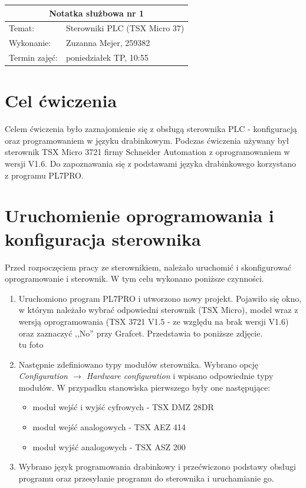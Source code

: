 \documentclass[12pt]{article}
\begin{document}
\begin{table}[H]
    \centering
    \renewcommand{\arraystretch}{1.5}
    \begin{tabularx}{\textwidth}{|X|X|}
    \hline
    \multicolumn{2}{|c|}{\large\textbf{Notatka służbowa nr 1}} \\ \hline
    Temat:          & Sterowniki PLC (TSX Micro 37)     \\ \hline
    Wykonanie:      & Zuzanna Mejer, 259382   \\ \hline
    Termin zajęć:   & poniedziałek TP, 10:55  \\ \hline  
    \end{tabularx}
    \end{table}

\section{Cel ćwiczenia}
Celem ćwiczenia było zaznajomienie się z obsługą sterownika PLC - konfiguracją oraz programowaniem w języku drabinkowym. Podczas ćwiczenia używany był sterownik TSX Micro 3721 firmy Schneider Automation z oprogramowaniem w wersji V1.6. Do zapoznawania się z podstawami języka drabinkowego korzystano z programu PL7PRO. 

\section{Uruchomienie oprogramowania i konfiguracja sterownika}
Przed rozpoczęciem pracy ze sterownikiem, należało uruchomić i skonfigurować oprogramowanie i sterownik. W tym celu wykonano poniższe czynności.

\begin{enumerate}
    \item Uruchomiono program PL7PRO i utworzono nowy projekt. Pojawiło się okno, w którym należało wybrać odpowiedni sterownik (TSX Micro), model wraz z wersją oprogramowania (TSX 3721 V1.5 - ze względu na brak wersji V1.6) oraz zaznaczyć ,,No'' przy Grafcet. Przedstawia to poniższe zdjęcie. \\ \colorbox{WildStrawberry}{tu foto}
    \item Następnie zdefiniowano typy modułów sterownika. Wybrano opcję \textit{Configuration $ \rightarrow $ Hardware configuration} i wpisano odpowiednie typy modułów. W przypadku stanowiska pierwszego były one następujące: 
    \begin{itemize}
        \item moduł wejść i wyjść cyfrowych - TSX DMZ 28DR
        \item moduł wejść analogowych - TSX AEZ 414
        \item moduł wyjść analogowych - TSX ASZ 200
    \end{itemize}
    \item Wybrano język programowania drabinkowy i przećwiczono podstawy obsługi programu oraz przesyłanie programu do sterownika i uruchamianie go.
\end{enumerate}
\end{document}
